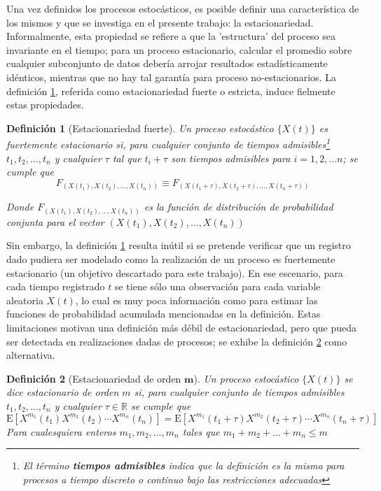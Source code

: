 \documentclass[12pt,a4paper]{mitthesis}
\newtheorem{defn}{Definici\'on}
\newcommand{\R}{\mathbb{R}}
\newcommand{\E}[1]{\mathrm{E}\left[ #1 \right]}
\begin{document}
Una vez definidos los procesos estoc\'asticos, es posible definir una caracter\'istica de los 
mismos y que se investiga en el presente trabajo: la estacionariedad.
Informalmente, esta propiedad se refiere a que la 'estructura' del proceso sea invariante en el
tiempo; para un proceso estacionario, calcular el promedio sobre cualquier subconjunto de datos 
deber\'ia arrojar resultados estad\'isticamente id\'enticos, mientras que no hay tal garant\'ia
para proceso no-estacionarios.
La definici\'on \ref{est_fuerte}, referida como estacionariedad fuerte o estricta, induce fielmente 
estas propiedades.

\begin{defn}[Estacionariedad fuerte]
Un proceso estoc\'astico $\{ X(t) \}$ es fuertemente estacionario si, para cualquier conjunto de 
tiempos admisibles\footnote{El t\'ermino \textbf{tiempos admisibles} indica que la definici\'on es 
la misma para procesos a tiempo discreto o continuo bajo las restricciones adecuadas} 
$t_1,t_2,\dots,t_n$ y cualquier $\tau$ tal que $t_i+\tau$ son tiempos admisibles para 
$i = 1, 2, \dots n$; se cumple que
\begin{equation*}
F_{\left(X(t_1),X(t_2),\dots,X(t_n)\right) }
\equiv
F_{\left(X(t_1+\tau),X(t_2+\tau),\dots,X(t_n+\tau)\right)}
\end{equation*}

Donde $F_{\left(X(t_1),X(t_2),\dots,X(t_n)\right) }$ es la funci\'on de distribuci\'on de 
probabilidad conjunta para el vector $\left(X(t_1),X(t_2),\dots,X(t_n)\right)$
\label{est_fuerte}
\end{defn}

Sin embargo, la definici\'on \ref{est_fuerte} resulta in\'util si se pretende verificar que un 
registro dado pudiera ser modelado como la realizaci\'on de un proceso es fuertemente estacionario 
(un objetivo descartado para este trabajo). En ese escenario, para cada tiempo registrado $t$ se 
tiene s\'olo una observaci\'on para cada variable aleatoria $X(t)$, lo cual es muy poca 
informaci\'on como para estimar las funciones de probabilidad acumulada mencionadas en la 
definici\'on.
Estas limitaciones motivan una definici\'on m\'as d\'ebil de estacionariedad, pero que pueda ser 
detectada en realizaciones dadas de procesos; se exhibe la definici\'on \ref{est_orden_m} como 
alternativa.

\begin{defn}[Estacionariedad de orden $\boldsymbol{m}$]
Un proceso estoc\'astico $\{ X(t) \}$ se dice estacionario de orden $m$ si, para cualquier conjunto 
de tiempos admisibles $t_1,t_2,\dots,t_n$ y cualquier $\tau \in \R$ se cumple que
\begin{equation*}
\E{ X^{m_1}(t_1)X^{m_2}(t_2)\cdots X^{m_n}(t_n) }
=
\E{ X^{m_1}(t_1+\tau)X^{m_2}(t_2+\tau)\cdots X^{m_n}(t_n+\tau) }
\end{equation*}
Para cualesquiera enteros $m_1,m_2,\dots,m_n$ tales que $m_1+m_2+\dots+m_n \leq m$
\label{est_orden_m}
\end{defn}
\end{document}
